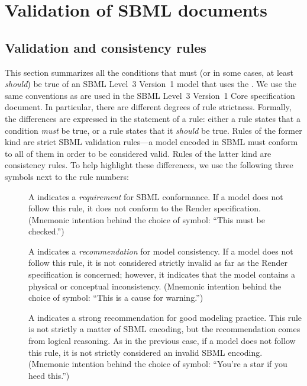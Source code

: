 
\section{Validation of SBML documents}
\label{apdx-validation}

\subsection{Validation and consistency rules}
\label{validation-rules}

This section summarizes all the conditions that must (or in some cases,
at least \emph{should}) be true of an SBML Level~3 Version~1 model that
uses the \RenderPackage. We use the same conventions as are used in the
SBML Level~3 Version~1 Core specification document. In particular, there
are different degrees of rule strictness. Formally, the differences are
expressed in the statement of a rule: either a rule states that a
condition \emph{must} be true, or a rule states that it \emph{should} be
true. Rules of the former kind are strict SBML validation rules---a
model encoded in SBML must conform to all of them in order to be
considered valid. Rules of the latter kind are consistency rules. To
help highlight these differences, we use the following three symbols
next to the rule numbers:

\begin{description}

\item[\hspace*{6.5pt}\vSymbol\vsp] A \vSymbolName indicates a
\emph{requirement} for SBML conformance. If a model does not follow this
rule, it does not conform to the Render specification. (Mnemonic
intention behind the choice of symbol: ``This must be checked.'')

\item[\hspace*{6.5pt}\cSymbol\csp] A \cSymbolName indicates a
\emph{recommendation} for model consistency. If a model does not follow
this rule, it is not considered strictly invalid as far as the Render
specification is concerned; however, it indicates that the model
contains a physical or conceptual inconsistency. (Mnemonic intention
behind the choice of symbol: ``This is a cause for warning.'')

\item[\hspace*{6.5pt}\mSymbol\msp] A \mSymbolName indicates a strong
recommendation for good modeling practice. This rule is not strictly a
matter of SBML encoding, but the recommendation comes from logical
reasoning. As in the previous case, if a model does not follow this
rule, it is not strictly considered an invalid SBML encoding. (Mnemonic
intention behind the choice of symbol: ``You're a star if you heed
this.'')

\end{description}


